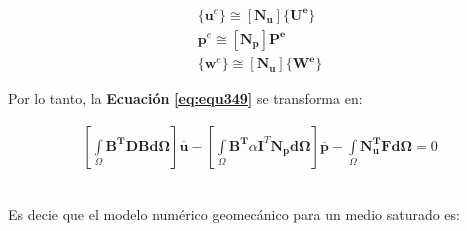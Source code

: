 \begin{ceqn} 
\begin{subequations} \label{eq:equ363} 
\begin{gather}
\{\mathbf{u}^e\} \cong  \left[\mathbf{N_u}\right] \{\mathbf{U^e}\} \label{eq:equ363a}\\[10pt]
\mathbf{p}^e \cong  \left[\mathbf{N_p}\right] \mathbf{P^e} \label{eq:equ363b}\\[10pt]
\{\mathbf{w}^e\} \cong \left[\mathbf{N_u}\right] \{\mathbf{W^e}\}  \label{eq:equ363c}
\end{gather}  
\end{subequations} 
\end{ceqn}
\bigskip













Por lo tanto, la \textbf{Ecuación} \textbf{\ref{eq:equ349}} se transforma en:

\begin{ceqn} %
\begin{gather}\label{eq:equ351}
\left[\int\limits_\Omega \mathbf{B^T}\mathbf{D}\mathbf{B}\mathbf{d\Omega}\right]\mathbf{\overline{u}}  - \left[\int\limits_\Omega \mathbf{B^T}\alpha\mathbf{I}^T\mathbf{N_p}\mathbf{d\Omega}\right]\mathbf{\overline{p}} - \int\limits_\Omega \mathbf{N_{u}^T}\mathbf{F}\mathbf{d\Omega} = 0
\end{gather}   
\end{ceqn}
\\
Es decie que el modelo numérico geomecánico para un medio saturado es:

